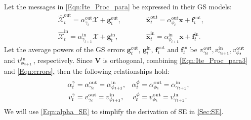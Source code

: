 \documentclass[journal]{IEEEtran}
\newcommand{\mr}{\mathrm}
\newcommand{\BS}{\begin{subequations}}
\newcommand{\ES}{\end{subequations}}
\renewcommand{\bf}{\bm}
\begin{document}
Let the messages in \eqref{Eqn:Ite_Proc_para} be expressed in their GS models: 
\BS\label{Eqn:errors}\begin{alignat}{2} 
& \bf{\mathcal{\hat{X}}}_{t}^{\mr{out}} = \alpha_{\gamma_t}^{\mr{out}}\bf{\mathcal{X}}+\bf{g}_{t}^{\mr{out}},&&  \hat{\bf{x}}_{t}^{\mr{out}} = \alpha_{\phi_t}^{\mr{out}}\bf{x}+\bf{f}_{t}^{\mr{out}},\label{Eqn:errorsa}\\
&\bf{\mathcal{\hat{X}}}^{\mr{in}}_{t} = \alpha_{\gamma_{t+1}}^{\mr{in}}\bf{\mathcal{X}}+{\bf{g}}^{\mr{in}}_{t}, &\qquad&\hat{\bf{x}}^{\mr{in}}_{t} = \alpha_{\phi_{t+1}}^{\mr{in}}\bf{x}+{\bf{f}}^{\mr{in}}_{t}.\label{Eqn:errorsb}
\end{alignat}\ES 
Let the average powers of the GS errors ${\bf{g}}^{\mr{out}}_{t}$,  ${\bf{g}}^{\mr{in}}_{t}$,  ${\bf{f}}^{\mr{out}}_{t}$ and ${\bf{f}}^{\mr{in}}_{t}$ be $v^{\rm out}_{\gamma_t}, v^{\rm in}_{\gamma_{t+1}}, v^{\rm out}_{\phi_t}$ and $v^{\rm in}_{\phi_{t+1}}$, respectively. {{Since $\bm V$ is orthogonal, combining \eqref{Eqn:Ite_Proc_para3} and \eqref{Eqn:errors}}}, then the following relationships hold:\vspace{-3mm}
\BS\label{Eqn:alpha_SE}\begin{align} 
\alpha_{t}^{\gamma}&=\alpha_{\gamma_t}^{\mr{out}}=\alpha_{\phi_{t+1}}^{\mr{in}},&
  \alpha_{t}^{\phi}&=\alpha_{\phi_t}^{\mr{out}}=\alpha_{\gamma_{t+1}}^{\mr{in}},\label{Eqn:alpha_SEa}\\ 
 v_{t}^{\gamma} &=v^{\rm out}_{\gamma_t}=v^{\rm in}_{\phi_{t+1}}, & v_{t}^{\phi}&=v^{\rm out}_{\phi_t}=v^{\rm in}_{\gamma_{t+1}}.\label{Eqn:alpha_SEb}
\end{align}\ES
We will use \eqref{Eqn:alpha_SE} to simplify the derivation of SE in \ref{Sec:SE}.
\end{document}
